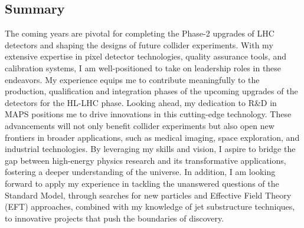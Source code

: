 {\begin{flushleft}
\vspace{\baselineskip}
\section{Summary} 
\vspace{\baselineskip}
The coming years are pivotal for completing the Phase-2 upgrades of LHC detectors and shaping the designs of future collider experiments. With my extensive expertise in pixel detector technologies, quality assurance tools, and calibration systems, I am well-positioned to take on leadership roles in these endeavors. My experience equips me to contribute meaningfully to the production, qualification and integration phases of the upcoming upgrades of the detectors for the HL-LHC phase.
Looking ahead, my dedication to R\&D in MAPS positions me to drive innovations in this cutting-edge technology. These advancements will not only benefit collider experiments but also open new frontiers in broader applications, such as medical imaging, space exploration, and industrial technologies. By leveraging my skills and vision, I aspire to bridge the gap between high-energy physics research and its transformative applications, fostering a deeper understanding of the universe.
In addition, I am looking forward to apply my experience in tackling the unanswered questions of the Standard Model, through searches for new particles and Effective Field Theory (EFT) approaches, combined with my knowledge of jet substructure techniques, to innovative projects that push the boundaries of discovery.

\end{flushleft}
}
